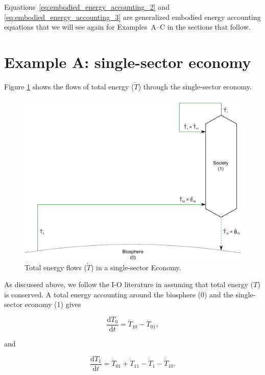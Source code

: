 Equations~\ref{eq:embodied_energy_accounting_2}
and \ref{eq:embodied_energy_accounting_3} are generalized
embodied energy accounting equations that we will
see again for Examples~A--C in the sections that follow.


\section{Example A: single-sector economy}

Figure \ref{fig:A_total_energy_T_dot} shows the flows 
of total energy ($\dot{T}$) through the single-sector economy.

\begin{figure}[h!]
\includegraphics[width=1.0\linewidth]{Part_2/Chapter_Embodied/images/1_sector_embodied_energy.pdf}
\caption{Total energy flows ($\dot{T}$) in a single-sector Economy.}
\label{fig:A_total_energy_T_dot}
\end{figure}

As discussed above, we follow the I-O literature in assuming that 
total energy ($T$) is conserved. 
A total energy accounting around the biosphere (0)
and the single-sector economy (1) gives

\begin{equation} \label{eq:A_T_acct_0}
	\frac{\mathrm{d}T_{0}}{\mathrm{d}t} 
	= \dot{T}_{10} 
	- \dot{T}_{01},
\end{equation}

\noindent and

\begin{equation} \label{eq:A_T_acct_1}
	\frac{\mathrm{d}T_{1}}{\mathrm{d}t} 
	= \dot{T}_{01} 
	+ \dot{T}_{11}
	- \dot{T}_{1}
	- \dot{T}_{10}.
\end{equation}

